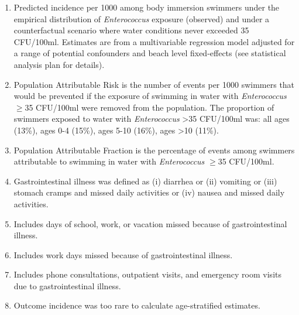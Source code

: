 \documentclass[12pt]{article}\usepackage[]{graphicx}\usepackage[]{color}
\begin{document}
\begin{table}[h!tb]
\begin{footnotesize}
\begin{center}
\begin{tabular}{l rr cc rl rl}
& \\
\hline
\end{tabular}
\end{center}
\end{footnotesize}
\begin{scriptsize}
\begin{minipage}{\textwidth}
\begin{enumerate}
  \setlength{\itemsep}{1pt}
  \item Predicted incidence per 1000 among body immersion swimmers under the empirical distribution of \textit{Enterococcus} exposure (observed) and under a counterfactual scenario where water conditions never exceeded 35 CFU/100ml. Estimates are from a multivariable regression model adjusted for a range of potential confounders and beach level fixed-effects (see statistical analysis plan for details).
  \item Population Attributable Risk is the number of events per 1000 swimmers that would be prevented if the exposure of swimming in water with \textit{Enterococcus} $\geq$35 CFU/100ml were removed from the population. The proportion of swimmers exposed to water with \textit{Enterococcus} >35 CFU/100ml was: all ages (13\%), ages 0-4 (15\%), ages 5-10 (16\%), ages >10 (11\%). 
  \item Population Attributable Fraction is the percentage of events among swimmers attributable to swimming in water with \textit{Enterococcus} $\geq$35 CFU/100ml.
  \item Gastrointestinal illness was defined as (i) diarrhea or (ii) vomiting or (iii) stomach cramps and missed daily activities or (iv) nausea and missed daily activities.
  \item Includes days of school, work, or vacation missed because of gastrointestinal illness.
  \item Includes work days missed because of gastrointestinal illness.
  \item Includes phone consultations, outpatient visits, and emergency room visits due to gastrointestinal illness. 
  \item Outcome incidence was too rare to calculate age-stratified estimates.
\end{enumerate}
\end{minipage}
\end{scriptsize}
\end{table}
\end{document}
